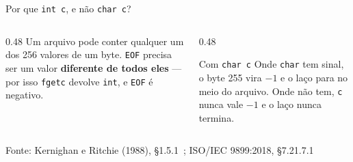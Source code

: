 \documentclass[aspectratio=169]{beamer}
\newcommand{\fonte}[1]{\vfill\hfill{\scriptsize\textcolor{UFSGray}{Fonte: #1}}}
\begin{document}
\begin{frame}{Por que \texttt{int c}, e não \texttt{char c}?}
  \begin{center}
  \end{center}
  \vspace{-0.3em}
  \begin{columns}[T]
    \begin{column}{0.48\textwidth}
      \small Um arquivo pode conter qualquer um dos 256 valores de um byte.
      \texttt{EOF} precisa ser um valor \textbf{diferente de todos eles}
      --- por isso \texttt{fgetc} devolve \texttt{int}, e \texttt{EOF} é
      negativo.
    \end{column}
    \begin{column}{0.48\textwidth}
      \begin{alertblock}{Com \texttt{char c}}
        \small Onde \texttt{char} tem sinal, o byte 255 vira $-1$ e
        o laço para no meio do arquivo. Onde não tem, \texttt{c} nunca
        vale $-1$ e o laço nunca termina.
      \end{alertblock}
    \end{column}
  \end{columns}
  \fonte{Kernighan e Ritchie (1988), §1.5.1~\cite{kernighan1988c};
    ISO/IEC 9899:2018, §7.21.7.1~\cite{iso2018c17}}
\end{frame}
\end{document}

